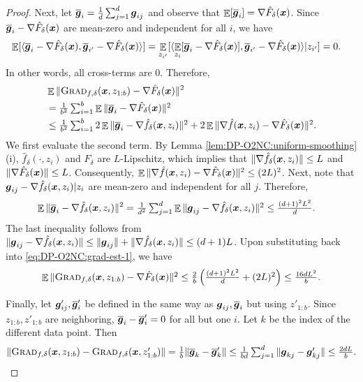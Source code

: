 \begin{proof}
Next, let $\overline{{\boldsymbol{g}}}_i = \frac{1}{d}\sum_{j=1}^d {\boldsymbol{g}}_{ij}$ and observe that $\mathop{\mathbb{E}}[\overline{{\boldsymbol{g}}}_i] = \nabla\hat F_\delta({\boldsymbol{x}})$. 
Since $\overline{{\boldsymbol{g}}}_i - \nabla\hat F_\delta({\boldsymbol{x}})$ are mean-zero and independent for all $i$, we have 
\begin{align*}
    \mathop{\mathbb{E}}[\langle \overline{{\boldsymbol{g}}}_i-\nabla\hat F_\delta({\boldsymbol{x}}), \overline{{\boldsymbol{g}}}_{i'}-\nabla\hat F_\delta({\boldsymbol{x}}) \rangle]
    &= \mathop{\mathbb{E}}_{z_{i'}}[ \langle \mathop{\mathbb{E}}_{z_i}[ \overline{{\boldsymbol{g}}}_i-\nabla\hat F_\delta({\boldsymbol{x}}) ], \overline{{\boldsymbol{g}}}_{i'}-\nabla\hat F_\delta({\boldsymbol{x}}) \rangle | z_{i'} ] = 0.
\end{align*}
In other words, all cross-terms are $0$. Therefore,
\begin{align}
    &\mathop{\mathbb{E}}\|{\normalfont\textsc{Grad}}_{f,\delta}({\boldsymbol{x}},z_{1:b}) - \nabla\hat F_\delta({\boldsymbol{x}})\|^2 \notag\\
    &= \textstyle \frac{1}{b^2}\sum_{i=1}^b \mathop{\mathbb{E}}\| \overline{{\boldsymbol{g}}}_i - \nabla\hat F_\delta({\boldsymbol{x}}) \|^2 \notag\\
    &\le \textstyle \frac{1}{b^2}\sum_{i=1}^b 2\mathop{\mathbb{E}}\|\overline{{\boldsymbol{g}}}_i - \nabla\hat f_\delta({\boldsymbol{x}},z_i)\|^2 + 2\mathop{\mathbb{E}}\|\nabla\hat f({\boldsymbol{x}},z_i) - \nabla\hat F_\delta({\boldsymbol{x}})\|^2.
    \label{eq:DP-O2NC:grad-est-1}
\end{align}
We first evaluate the second term.
By Lemma \ref{lem:DP-O2NC:uniform-smoothing} (i), $\hat f_\delta(\cdot,z_i)$ and $F_\delta$ are $L$-Lipschitz, which implies that $\|\nabla\hat f_\delta({\boldsymbol{x}},z_i)\|\le L$ and $\|\nabla\hat F_\delta({\boldsymbol{x}})\| \le L$. Consequently, $\mathop{\mathbb{E}}\|\nabla\hat f({\boldsymbol{x}},z_i) - \nabla\hat F_\delta({\boldsymbol{x}})\|^2 \le (2L)^2$. 
Next, note that ${\boldsymbol{g}}_{ij}-\nabla\hat f_\delta({\boldsymbol{x}},z_i)|z_i$ are mean-zero and independent for all $j$. Therefore,
\begin{align*}
    \mathop{\mathbb{E}}\|\overline{{\boldsymbol{g}}}_i - \nabla\hat f_\delta({\boldsymbol{x}},z_i)\|^2 
    &= \textstyle \frac{1}{d^2}\sum_{j=1}^d \mathop{\mathbb{E}}\|{\boldsymbol{g}}_{ij} - \nabla\hat f_\delta({\boldsymbol{x}},z_i)\|^2 
    \le \frac{(d+1)^2L^2}{d}.
\end{align*}
The last inequality follows from $\|{\boldsymbol{g}}_{ij} - \nabla\hat f_\delta({\boldsymbol{x}},z_i)\| \le \|{\boldsymbol{g}}_{ij}\| + \|\nabla\hat f_\delta({\boldsymbol{x}},z_i)\| \le (d+1)L$.
Upon substituting back into \eqref{eq:DP-O2NC:grad-est-1}, we have
\begin{equation*}
    \textstyle
    \mathop{\mathbb{E}}\|{\normalfont\textsc{Grad}}_{f,\delta}({\boldsymbol{x}},z_{1:b}) - \nabla\hat F_\delta({\boldsymbol{x}})\|^2
    \le \frac{2}{b} \left( \frac{(d+1)^2L^2}{d} + (2L)^2 \right) 
    \le \frac{16dL^2}{b}. 
\end{equation*}

Finally, let ${\boldsymbol{g}}'_{ij},\overline{{\boldsymbol{g}}}'_i$ be defined in the same way as ${\boldsymbol{g}}_{ij},\overline{{\boldsymbol{g}}}_i$ but using $z'_{1:b}$. Since $z_{1:b},z'_{1:b}$ are neighboring, $\overline{{\boldsymbol{g}}}_i - \overline{{\boldsymbol{g}}}_i' = 0$ for all but one $i$. Let $k$ be the index of the different data point. Then
\begin{equation*}
    \textstyle
    \|{\normalfont\textsc{Grad}}_{f,\delta}({\boldsymbol{x}},z_{1:b}) - {\normalfont\textsc{Grad}}_{f,\delta}({\boldsymbol{x}},z'_{1:b})\| 
    = \frac{1}{b}\|\overline{{\boldsymbol{g}}}_k - \overline{{\boldsymbol{g}}}_k'\| 
    \le \frac{1}{bd}\sum_{j=1}^d \| {\boldsymbol{g}}_{kj} - {\boldsymbol{g}}_{kj}' \| 
    \le \frac{2dL}{b}. 
    \qedhere
\end{equation*}
\end{proof}


